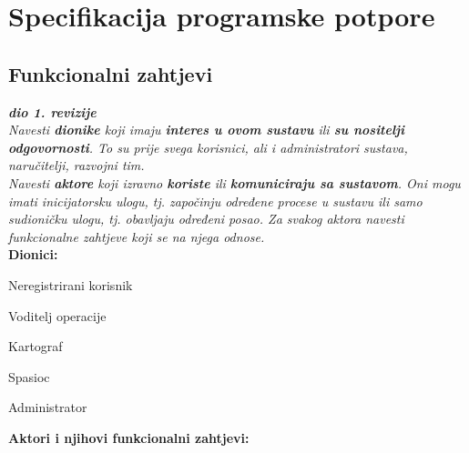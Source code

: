\chapter{Specifikacija programske potpore}
		
	\section{Funkcionalni zahtjevi}
			
			\textbf{\textit{dio 1. revizije}}\\
			
			\textit{Navesti \textbf{dionike} koji imaju \textbf{interes u ovom sustavu} ili  \textbf{su nositelji odgovornosti}. To su prije svega korisnici, ali i administratori sustava, naručitelji, razvojni tim.}\\
				
			\textit{Navesti \textbf{aktore} koji izravno \textbf{koriste} ili \textbf{komuniciraju sa sustavom}. Oni mogu imati inicijatorsku ulogu, tj. započinju određene procese u sustavu ili samo sudioničku ulogu, tj. obavljaju određeni posao. Za svakog aktora navesti funkcionalne zahtjeve koji se na njega odnose.}\\
			
			
			\noindent \textbf{Dionici:}
			
			\begin{packed_enum}
				
				\item Neregistrirani korisnik
				\item Voditelj operacije				
				\item Kartograf
				\item Spasioc
				\item Administrator
				
			\end{packed_enum}
			
			\noindent \textbf{Aktori i njihovi funkcionalni zahtjevi:}
			
